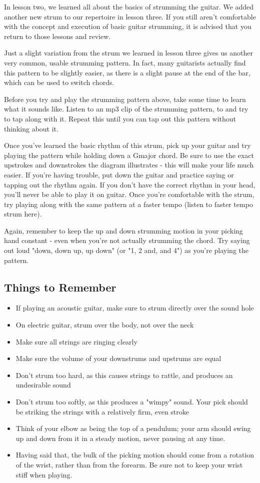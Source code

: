 In lesson two, we learned all about the basics of strumming the guitar. We added another new strum to our repertoire in lesson three. If you still aren't comfortable with the concept and execution of basic guitar strumming, it is advised that you return to those lessons and review.

Just a slight variation from the strum we learned in lesson three gives us another very common, usable strumming pattern. In fact, many guitarists actually find this pattern to be slightly easier, as there is a slight pause at the end of the bar, which can be used to switch chords.

Before you try and play the strumming pattern above, take some time to learn what it sounds like. Listen to an mp3 clip of the strumming pattern, to and try to tap along with it. Repeat this until you can tap out this pattern without thinking about it.

Once you've learned the basic rhythm of this strum, pick up your guitar and try playing the pattern while holding down a Gmajor chord. Be sure to use the exact upstrokes and downstrokes the diagram illustrates - this will make your life much easier. If you're having trouble, put down the guitar and practice saying or tapping out the rhythm again. If you don't have the correct rhythm in your head, you'll never be able to play it on guitar. Once you're comfortable with the strum, try playing along with the same pattern at a faster tempo (listen to faster tempo strum here).

Again, remember to keep the up and down strumming motion in your picking hand constant - even when you're not actually strumming the chord. Try saying out loud "down, down up, up down" (or "1, 2 and, and 4") as you're playing the pattern.

\subsection{Things to Remember}
\begin{itemize}
\item If playing an acoustic guitar, make sure to strum directly over the sound hole
\item On electric guitar, strum over the body, not over the neck
\item Make sure all strings are ringing clearly
\item Make sure the volume of your downstrums and upstrums are equal
\item Don't strum too hard, as this causes strings to rattle, and produces an undesirable sound
\item Don't strum too softly, as this produces a "wimpy" sound. Your pick should be striking the strings with a relatively firm, even stroke
\item Think of your elbow as being the top of a pendulum; your arm should swing up and down from it in a steady motion, never pausing at any time.
\item Having said that, the bulk of the picking motion should come from a rotation of the wrist, rather than from the forearm. Be sure not to keep your wrist stiff when playing.
\end{itemize}

